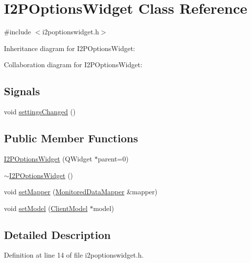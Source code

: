 \hypertarget{class_i2_p_options_widget}{}\section{I2\+P\+Options\+Widget Class Reference}
\label{class_i2_p_options_widget}


{\ttfamily \#include $<$i2poptionswidget.\+h$>$}



Inheritance diagram for I2\+P\+Options\+Widget\+:


Collaboration diagram for I2\+P\+Options\+Widget\+:
\subsection*{Signals}
\begin{DoxyCompactItemize}
\item 
void \hyperlink{class_i2_p_options_widget_af736252192d753c976d43b01c3c1203b}{settings\+Changed} ()
\end{DoxyCompactItemize}
\subsection*{Public Member Functions}
\begin{DoxyCompactItemize}
\item 
\hyperlink{class_i2_p_options_widget_acc81cb498f44f4b877c0c35bc4a308e5}{I2\+P\+Options\+Widget} (Q\+Widget $\ast$parent=0)
\item 
\hyperlink{class_i2_p_options_widget_aa871b5127452be0087c66998ef0a63ae}{$\sim$\+I2\+P\+Options\+Widget} ()
\item 
void \hyperlink{class_i2_p_options_widget_ae87e45f309b5a3abd782f3b6020eac4f}{set\+Mapper} (\hyperlink{class_monitored_data_mapper}{Monitored\+Data\+Mapper} \&mapper)
\item 
void \hyperlink{class_i2_p_options_widget_af29f341419d72dd0cfb031d2656d4588}{set\+Model} (\hyperlink{class_client_model}{Client\+Model} $\ast$model)
\end{DoxyCompactItemize}


\subsection{Detailed Description}


Definition at line 14 of file i2poptionswidget.\+h.



